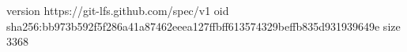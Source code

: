 version https://git-lfs.github.com/spec/v1
oid sha256:bb973b592f5f286a41a87462eeea127ffbff613574329beffb835d931939649e
size 3368
